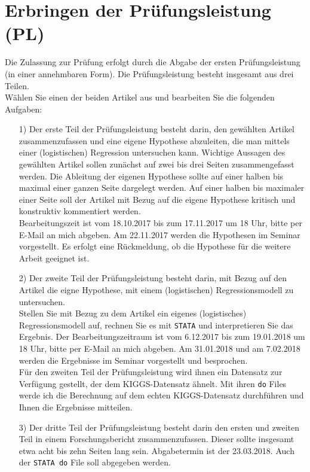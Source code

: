 \documentclass[a4paper,fontsize=14pt]{article}
\begin{document}
\section{Erbringen der Prüfungsleistung (PL)}
Die Zulassung zur Prüfung erfolgt durch die Abgabe der ersten Prüfungsleistung (in einer annehmbaren Form).
Die Prüfungsleistung besteht insgesamt aus drei Teilen.\\
 Wählen Sie einen der beiden Artikel aus und bearbeiten Sie die folgenden
Aufgaben:
\begin{itemize}
\item[1)]{Der erste Teil der Prüfungsleistung besteht darin, den gewählten  Artikel zusammenzufassen und eine eigene Hypothese
abzuleiten, die man mittels einer (logistischen) Regression untersuchen kann.
 Wichtige  Aussagen des gewählten  Artikel sollen zunächst auf zwei bis drei Seiten zusammengefasst werden. 
 Die Ableitung der eigenen Hypothese sollte auf einer halben bis maximal einer ganzen Seite dargelegt werden.
Auf einer halben bis maximaler einer Seite soll der Artikel mit Bezug auf die eigene Hypothese  kritisch und konstruktiv kommentiert werden.
\\
Bearbeitungszeit ist vom 18.10.2017 bis zum 17.11.2017 um 18 Uhr, bitte per E-Mail an mich abgeben. Am 22.11.2017 werden
die Hypothesen im Seminar vorgestellt. Es erfolgt eine Rückmeldung, ob die Hypothese für die weitere Arbeit geeignet ist.}
\item[2)]{Der zweite Teil der Prüfungsleistung besteht darin, mit Bezug auf den Artikel die eigne Hypothese,
mit einem (logistischen) Regressionsmodell zu untersuchen. 
\\ Stellen
Sie mit Bezug zu dem Artikel ein eigenes (logistisches) Regressionsmodell  auf, rechnen Sie es mit \texttt{STATA}
und interpretieren Sie das Ergebnis. Der Bearbeitungszeitraum ist vom 6.12.2017 bis zum 19.01.2018 um 18 Uhr, bitte per E-Mail an mich abgeben.
Am 31.01.2018 und am 7.02.2018 werden die Ergebnisse im Seminar vorgestellt und besprochen.\\
Für den zweiten Teil der Prüfungsleistung wird ihnen ein Datensatz zur Verfügung gestellt, der dem KIGGS-Datensatz
ähnelt. Mit ihren \texttt{do} Files werde ich die Berechnung auf dem echten KIGGS-Datensatz durchführen und Ihnen
die Ergebnisse mitteilen. }
\item[3)]{Der dritte Teil der Prüfungsleistung besteht darin den ersten und zweiten Teil in einem Forschungsbericht zusammenzufassen.
Dieser sollte insgesamt etwa acht bis zehn Seiten lang sein. Abgabetermin ist der 23.03.2018. Auch der \texttt{STATA do} File
soll abgegeben werden.}
\end{itemize}
\end{document}
